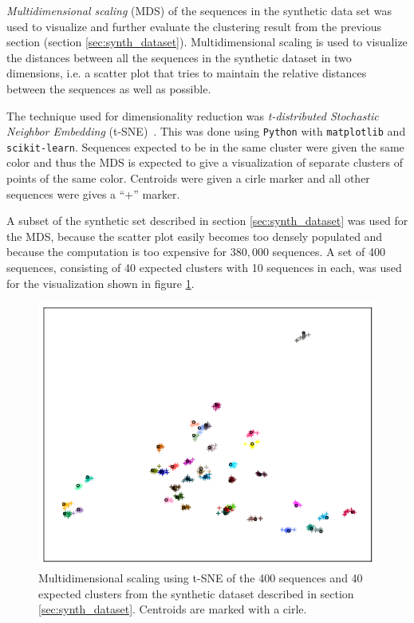 \emph{Multidimensional scaling} (MDS) of the sequences in the synthetic data
set was used to visualize and further evaluate the clustering result from the
previous section (section \ref{sec:synth_dataset}). Multidimensional scaling
is used to visualize the distances between all the sequences in the synthetic
dataset in two dimensions, i.e. a scatter plot that tries to maintain the
relative distances between the sequences as well as possible.

The technique used for dimensionality reduction was \emph{t-distributed
Stochastic Neighbor Embedding} (t-SNE)~\cite{maaten}. This was done using
\texttt{Python} with \texttt{matplotlib} and \texttt{scikit-learn}. Sequences
expected to be in the same cluster were given the same color and thus the MDS
is expected to give a visualization of separate clusters of points of the same
color. Centroids were given a cirle marker and all other sequences were gives a
``+'' marker.

A subset of the synthetic set described in section \ref{sec:synth_dataset} was
used for the MDS, because the scatter plot easily becomes too densely populated
and because the computation is too expensive for $380,000$ sequences. A set of
400 sequences, consisting of 40 expected clusters with 10 sequences in each,
was used for the visualization shown in figure \ref{fig:mds_synth}.

\begin{figure}[H]
  \includegraphics[width=\textwidth]{graphics/MDS_t-SNE_synth_silva_400.png}
  \caption{Multidimensional scaling using t-SNE of the 400 sequences and
    40 expected clusters from the synthetic dataset described in section
    \ref{sec:synth_dataset}. Centroids are marked with a cirle.}
  \label{fig:mds_synth}
\end{figure}

